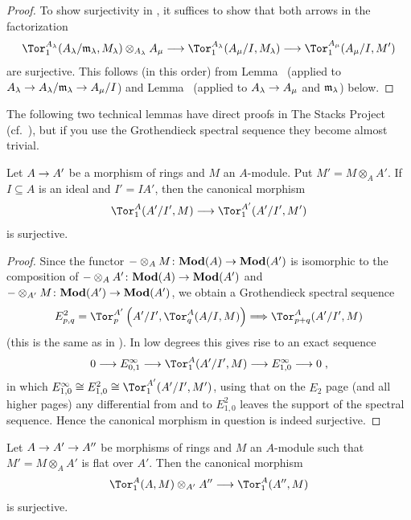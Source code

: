 \documentclass[a4paper,parskip=half,numbers=enddot, DIV=12]{scrreprt}
\begin{document}
\begin{proof}
	To show surjectivity in , it suffices to show that both arrows in the factorization
	\begin{align*}
	\Tor_1^{A_\lambda}(A_\lambda/\mm_\lambda,M_\lambda)\otimes_{A_\lambda}A_\mu\morphism \Tor_1^{A_\lambda}(A_\mu/I,M_\lambda)\morphism \Tor_1^{A_\mu}(A_\mu/I,M')
	\end{align*}
	are surjective. This follows (in this order) from Lemma~ (applied to $A_\lambda\morphism A_\lambda/\mm_\lambda\morphism A_\mu/I$) and Lemma~ (applied to $A_\lambda\morphism A_\mu$ and $\mathfrak{m}_\lambda$) below.
\end{proof}
The following two technical lemmas have direct proofs in The Stacks Project (cf.\ \cite[ and ]{stacks-project}), but if you use the Grothendieck spectral sequence they become almost trivial.
\begin{lem}
	Let $A\morphism A'$ be a morphism of rings and $M$ an $A$-module. Put $M'=M\otimes_AA'$. If $I\subseteq A$ is an ideal and $I'=IA'$, then the canonical morphism
	\begin{align*}
	\Tor_1^A(A'/I',M)\morphism\Tor_1^{A'}(A'/I',M')
	\end{align*}
	is surjective.
\end{lem}
\begin{proof}
	Since the functor $-\otimes_AM\colon \cat{Mod}(A)\morphism \cat{Mod}(A')$ is isomorphic to the composition of $-\otimes_AA'\colon\cat{Mod}(A)\morphism \cat{Mod}(A')$ and $-\otimes_{A'}M\colon \cat{Mod}(A')\morphism \cat{Mod}(A')$, we obtain a Grothendieck spectral sequence
	\begin{align*}
	E_{p,q}^2=\Tor_p^{A'}\left(A'/I',\Tor_q^A(A/I,M)\right)\converge \Tor_{p+q}^A(A'/I',M)
	\end{align*}
	(this is the same as in ). In low degrees this gives rise to an exact sequence
	\begin{align*}
	0\morphism E_{0,1}^\infty\morphism\Tor_1^A(A'/I',M)\morphism E_{1,0}^\infty\morphism 0\;,
	\end{align*}
	in which $E_{1,0}^\infty\cong E_{1,0}^2\cong \Tor_1^{A'}(A'/I',M')$, using that on the $E_2$ page (and all higher pages) any differential from and to $E_{1,0}^2$ leaves the support of the spectral sequence. Hence the canonical morphism in question is indeed surjective.
\end{proof}
\begin{lem}
	Let $A\morphism A'\morphism A''$ be morphisms of rings and $M$ an $A$-module such that $M'=M\otimes_AA'$ is flat over $A'$. Then the canonical morphism
	\begin{align*}
	\Tor_1^A(A,M)\otimes_{A'}A''\morphism \Tor_1^A(A'',M)
	\end{align*}
	is surjective.
\end{lem}
\end{document}
